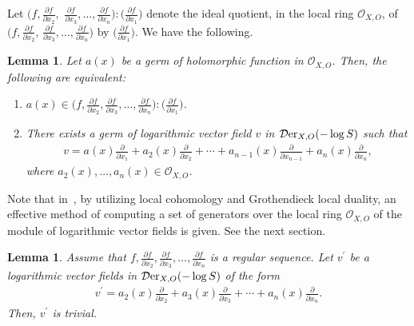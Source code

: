 \documentclass[10pt,a4paper]{amsart}
\numberwithin{equation}{section}
\newtheorem{Lemma}[Theorem]{Lemma}
\begin{document}
Let $\big(f, \frac{\partial f}{\partial x_2},$ $\frac{\partial f}{\partial x_3},\ldots,\frac{\partial f}{\partial x_{n}}\big) : \big(\frac{\partial f}{\partial x_1}\big) $ denote the ideal quotient, in the local ring ${\mathcal O}_{X,O}$, of
$\big(f, \frac{\partial f}{\partial x_2}$, $\frac{\partial f}{\partial x_3},\ldots,
\frac{\partial f}{\partial x_{n}}\big)$ by $\big(\frac{\partial f}{\partial x_1}\big)$. We have the following.


\begin{Lemma}\label{Lem2}
Let $ a(x) $ be a germ of holomorphic function in $ {\mathcal O}_{X,O}$. Then, the following are equivalent:
\begin{enumerate}\itemsep=0pt
\item[$(i)$]
$\displaystyle a(x) \in \bigg(f, \frac{\partial f}{\partial x_2}, \frac{\partial f}{\partial x_3},\ldots,\frac{\partial f}{\partial x_{n}}\bigg) : \bigg(\frac{\partial f}{\partial x_1}\bigg)$.

\item[$(ii)$]
There exists a germ of logarithmic vector field $v$ in ${\mathcal D}{\rm er}_{X, O}(-\log S)$ such that
\begin{gather*}
v= a(x)\frac{\partial }{\partial x_1} + a_2(x)\frac{\partial}{\partial x_2} + \cdots + a_{n-1}(x)\frac{\partial}{\partial x_{n-1}}+ a_n(x)\frac{\partial}{\partial x_n},
\end{gather*}
where $ a_2(x), \ldots , a_{n}(x) \in {\mathcal O}_{X, O}$.
\end{enumerate}
\end{Lemma}

Note that in~\cite{NT18,NT19a}, by utilizing local cohomology and Grothendieck local duality, an effective method of computing a set of generators over the local ring ${\mathcal O}_{X,O}$ of the module of logarithmic vector fields is given. See the next section.

\begin{Lemma}\label{Lem3}
Assume that $f, \frac{\partial f}{\partial x_2}, \frac{\partial f}{\partial x_3}, \ldots, \frac{\partial f}{\partial x_{n}}$ is a regular sequence. Let $v^{\prime}$ be a logarithmic vector fields in ${\mathcal D}{\rm er}_{X, O}(-\log S)$ of the form
\begin{gather*}
v^{\prime}= a_2(x)\frac{\partial }{\partial x_2} + a_3(x)\frac{\partial}{\partial x_3} + \cdots +a_{n}(x)\frac{\partial}{\partial x_{n}}.
\end{gather*}
Then, $v^{\prime}$ is trivial.
\end{Lemma}
\end{document}
